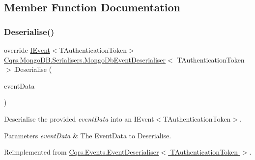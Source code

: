 \subsection{Member Function Documentation}
\mbox{\label{classCqrs_1_1MongoDB_1_1Serialisers_1_1MongoDbEventDeserialiser_a2ea63367d97bf66e3dffcabb8c53005e_a2ea63367d97bf66e3dffcabb8c53005e}} 
\subsubsection{\texorpdfstring{Deserialise()}{Deserialise()}}
{\footnotesize\ttfamily override \hyperlink{interfaceCqrs_1_1Events_1_1IEvent}{I\+Event}$<$T\+Authentication\+Token$>$ \hyperlink{classCqrs_1_1MongoDB_1_1Serialisers_1_1MongoDbEventDeserialiser}{Cqrs.\+Mongo\+D\+B.\+Serialisers.\+Mongo\+Db\+Event\+Deserialiser}$<$ T\+Authentication\+Token $>$.Deserialise (\begin{DoxyParamCaption}\item[{\hyperlink{classCqrs_1_1Events_1_1EventData}{Event\+Data}}]{event\+Data }\end{DoxyParamCaption})\hspace{0.3cm}{\ttfamily [virtual]}}



Deserialise the provided {\itshape event\+Data}  into an I\+Event$<$\+T\+Authentication\+Token$>$. 


\begin{DoxyParams}{Parameters}
{\em event\+Data} & The Event\+Data to Deserialise.\\
\hline
\end{DoxyParams}


Reimplemented from \hyperlink{classCqrs_1_1Events_1_1EventDeserialiser_a193feac1d58446f0a7447d8ba04179fc_a193feac1d58446f0a7447d8ba04179fc}{Cqrs.\+Events.\+Event\+Deserialiser$<$ T\+Authentication\+Token $>$}.

